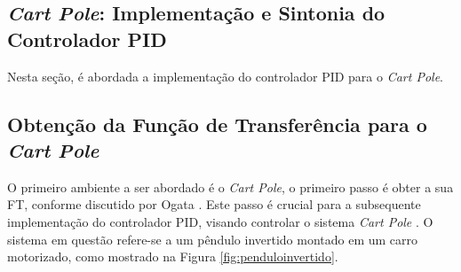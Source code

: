 \documentclass[12pt,           %
a4paper,                       %
openany,                       %
oneside,                       %
chapter=TITLE,                 %
english,                       %
spanish,                       %
brazil,                        %
sumario=tradicional]{abntex2}  %
\begin{document}
\begin{OnehalfSpace}
\section{\textit{Cart Pole}: Implementação e Sintonia do Controlador PID}
\label{sec:pidcartpole}                     %

Nesta seção, é abordada a implementação do controlador PID para o \textit{Cart Pole}.

\subsection{Obtenção da Função de Transferência para o \textit{Cart Pole}}
\label{subsec:titprov}                     %

O primeiro ambiente a ser abordado é o \textit{Cart Pole}, o primeiro passo é obter a sua FT, conforme discutido por Ogata \cite{ogata2010engenharia}. Este passo é crucial para a subsequente implementação do controlador PID, visando controlar o sistema \textit{Cart Pole} \cite{cpepid}. O sistema em questão refere-se a um pêndulo invertido montado em um carro motorizado, como mostrado na Figura \ref{fig:penduloinvertido}.


\end{OnehalfSpace}
\end{document}
